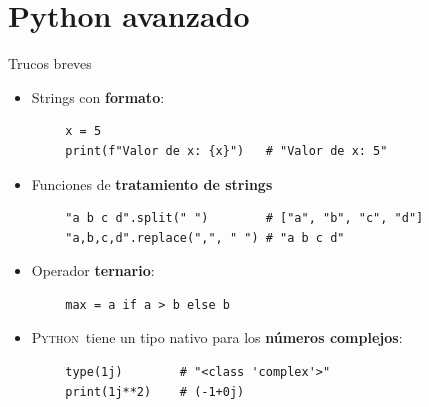 \documentclass[10pt]{beamer} %
\newcommand{\py}{\textsc{Python}}
\begin{document}
\section{Python avanzado}

\begin{frame}[fragile]{Trucos breves}
    \begin{itemize}
        \item Strings con \textbf{formato}:
    \end{itemize}
    \begin{verbatim}
        x = 5
        print(f"Valor de x: {x}")   # "Valor de x: 5"
    \end{verbatim}
    \begin{itemize}
        \item Funciones de \textbf{tratamiento de strings}
    \end{itemize}
    \begin{verbatim}
        "a b c d".split(" ")        # ["a", "b", "c", "d"]
        "a,b,c,d".replace(",", " ") # "a b c d"   
    \end{verbatim}
    \begin{itemize}
        \item Operador \textbf{ternario}:
    \end{itemize}
    \begin{verbatim}
        max = a if a > b else b
    \end{verbatim}
    \begin{itemize}
        \item \py\, tiene un tipo nativo para los \textbf{números complejos}:
    \end{itemize}
    \begin{verbatim}
        type(1j)        # "<class 'complex'>"
        print(1j**2)    # (-1+0j)
    \end{verbatim}
\end{frame}
\end{document}
